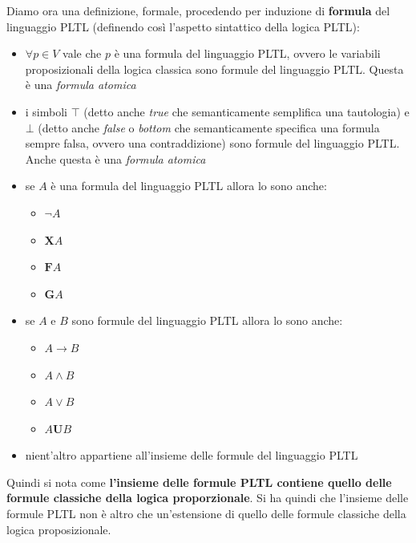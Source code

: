 \documentclass[a4paper,12pt, oneside]{book}
\begin{document}
\begin{definizione}
  Diamo ora una definizione, formale, procedendo per induzione di
  \textbf{formula} del linguaggio PLTL (definendo così l'aspetto sintattico
  della logica PLTL): 
  \begin{itemize}
    \item $\forall p\in V$ vale che $p$ è una formula del linguaggio PLTL,
    ovvero le variabili proposizionali della logica classica sono formule del
    linguaggio PLTL. Questa è una \emph{formula atomica}
    \item i simboli $\top$ (detto anche \emph{true} che semanticamente semplifica
    una tautologia) e $\bot$ (detto anche \textit{false} o \emph{bottom} che
    semanticamente specifica una formula sempre falsa, ovvero una
    contraddizione) sono formule del linguaggio PLTL. Anche questa è una
    \emph{formula atomica}
    \item se $A$ è una formula del linguaggio PLTL allora lo sono anche:
    \begin{itemize}[label=$\ast$]
      \item $\neg A$
      \item $\mathbf{X}A$
      \item $\mathbf{F}A$
      \item $\mathbf{G}A$
    \end{itemize}
    \newpage
    \item  se $A$ e $B$ sono formule del linguaggio PLTL allora lo sono anche:
    \begin{itemize}[label=$\ast$]
      \item $A\to B$
      \item $A\land B$
      \item $A\lor B$
      \item $A\mathbf{U}B$
    \end{itemize}
    \item nient'altro appartiene all'insieme delle formule del linguaggio PLTL
  \end{itemize}
  Quindi si nota come \textbf{l'insieme delle formule PLTL contiene quello delle
    formule classiche della logica proporzionale}. Si ha quindi che l'insieme
  delle formule PLTL non è altro che un'estensione di quello delle formule
  classiche della logica proposizionale.\\
\end{definizione}
\end{document}
